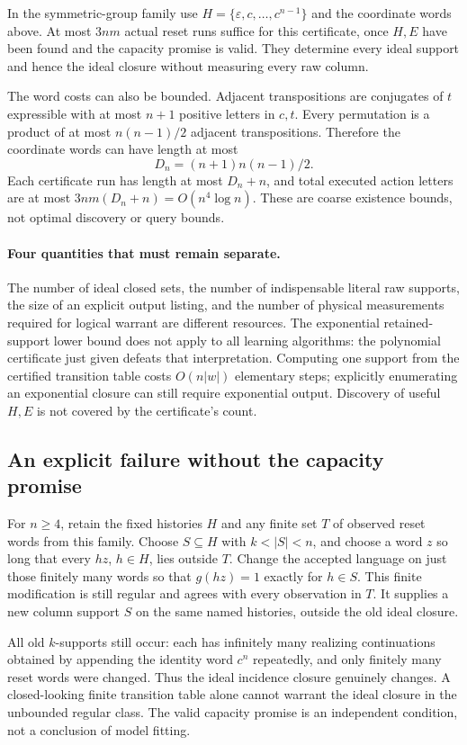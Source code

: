 \documentclass[11pt]{article}
\theoremstyle{remark}
\newcommand{\eps}{\varepsilon}
\begin{document}
In the symmetric-group family use $H=\{\eps,c,\ldots,c^{n-1}\}$ and the coordinate words above. At most $3nm$ actual reset runs suffice for this certificate, once $H,E$ have been found and the capacity promise is valid. They determine every ideal support and hence the ideal closure without measuring every raw column.

The word costs can also be bounded. Adjacent transpositions are conjugates of $t$ expressible with at most $n+1$ positive letters in $c,t$. Every permutation is a product of at most $n(n-1)/2$ adjacent transpositions. Therefore the coordinate words can have length at most
\[
 D_n=(n+1)n(n-1)/2.
\]
Each certificate run has length at most $D_n+n$, and total executed action letters are at most $3nm(D_n+n)=O(n^4\log n)$. These are coarse existence bounds, not optimal discovery or query bounds.

\paragraph{Four quantities that must remain separate.}
The number of ideal closed sets, the number of indispensable literal raw supports, the size of an explicit output listing, and the number of physical measurements required for logical warrant are different resources. The exponential retained-support lower bound does not apply to all learning algorithms: the polynomial certificate just given defeats that interpretation. Computing one support from the certified transition table costs $O(n|w|)$ elementary steps; explicitly enumerating an exponential closure can still require exponential output. Discovery of useful $H,E$ is not covered by the certificate's count.

\subsection{An explicit failure without the capacity promise}

For $n\ge4$, retain the fixed histories $H$ and any finite set $T$ of observed reset words from this family. Choose $S\subseteq H$ with $k<|S|<n$, and choose a word $z$ so long that every $hz$, $h\in H$, lies outside $T$. Change the accepted language on just those finitely many words so that $g(hz)=1$ exactly for $h\in S$. This finite modification is still regular and agrees with every observation in $T$. It supplies a new column support $S$ on the same named histories, outside the old ideal closure.

All old $k$-supports still occur: each has infinitely many realizing continuations obtained by appending the identity word $c^n$ repeatedly, and only finitely many reset words were changed. Thus the ideal incidence closure genuinely changes. A closed-looking finite transition table alone cannot warrant the ideal closure in the unbounded regular class. The valid capacity promise is an independent condition, not a conclusion of model fitting.
\end{document}
